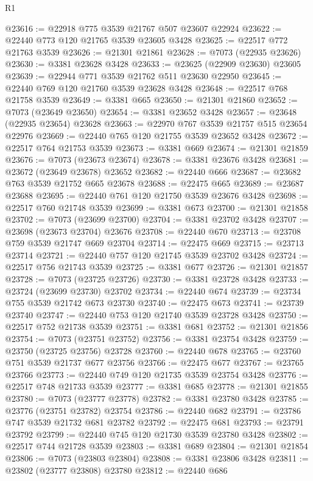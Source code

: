 \begin{lexlean}{R1}
\begin{coremodule}
@23616 := @22918 @775 @3539 @21767 @507 @23607 @22924
@23622 := @22440 @773 @120 @21765 @3539 @23605 @3428
@23625 := @22517 @772 @21763 @3539
@23626 := @21301 @21861
@23628 := @7073 (@22935 @23626)
@23630 := @3381 @23628 @3428
@23633 := @23625 (@22909 @23630) @23605
@23639 := @22944 @771 @3539 @21762 @511 @23630 @22950
@23645 := @22440 @769 @120 @21760 @3539 @23628 @3428
@23648 := @22517 @768 @21758 @3539
@23649 := @3381 @665
@23650 := @21301 @21860
@23652 := @7073 (@23649 @23650)
@23654 := @3381 @23652 @3428
@23657 := @23648 (@22935 @23654) @23628
@23663 := @22970 @767 @3539 @21757 @515 @23654 @22976
@23669 := @22440 @765 @120 @21755 @3539 @23652 @3428
@23672 := @22517 @764 @21753 @3539
@23673 := @3381 @669
@23674 := @21301 @21859
@23676 := @7073 (@23673 @23674)
@23678 := @3381 @23676 @3428
@23681 := @23672 (@23649 @23678) @23652
@23682 := @22440 @666
@23687 := @23682 @763 @3539 @21752 @665 @23678
@23688 := @22475 @665
@23689 := @23687 @23688
@23695 := @22440 @761 @120 @21750 @3539 @23676 @3428
@23698 := @22517 @760 @21748 @3539
@23699 := @3381 @673
@23700 := @21301 @21858
@23702 := @7073 (@23699 @23700)
@23704 := @3381 @23702 @3428
@23707 := @23698 (@23673 @23704) @23676
@23708 := @22440 @670
@23713 := @23708 @759 @3539 @21747 @669 @23704
@23714 := @22475 @669
@23715 := @23713 @23714
@23721 := @22440 @757 @120 @21745 @3539 @23702 @3428
@23724 := @22517 @756 @21743 @3539
@23725 := @3381 @677
@23726 := @21301 @21857
@23728 := @7073 (@23725 @23726)
@23730 := @3381 @23728 @3428
@23733 := @23724 (@23699 @23730) @23702
@23734 := @22440 @674
@23739 := @23734 @755 @3539 @21742 @673 @23730
@23740 := @22475 @673
@23741 := @23739 @23740
@23747 := @22440 @753 @120 @21740 @3539 @23728 @3428
@23750 := @22517 @752 @21738 @3539
@23751 := @3381 @681
@23752 := @21301 @21856
@23754 := @7073 (@23751 @23752)
@23756 := @3381 @23754 @3428
@23759 := @23750 (@23725 @23756) @23728
@23760 := @22440 @678
@23765 := @23760 @751 @3539 @21737 @677 @23756
@23766 := @22475 @677
@23767 := @23765 @23766
@23773 := @22440 @749 @120 @21735 @3539 @23754 @3428
@23776 := @22517 @748 @21733 @3539
@23777 := @3381 @685
@23778 := @21301 @21855
@23780 := @7073 (@23777 @23778)
@23782 := @3381 @23780 @3428
@23785 := @23776 (@23751 @23782) @23754
@23786 := @22440 @682
@23791 := @23786 @747 @3539 @21732 @681 @23782
@23792 := @22475 @681
@23793 := @23791 @23792
@23799 := @22440 @745 @120 @21730 @3539 @23780 @3428
@23802 := @22517 @744 @21728 @3539
@23803 := @3381 @689
@23804 := @21301 @21854
@23806 := @7073 (@23803 @23804)
@23808 := @3381 @23806 @3428
@23811 := @23802 (@23777 @23808) @23780
@23812 := @22440 @686

\end{coremodule}
\end{lexlean}
